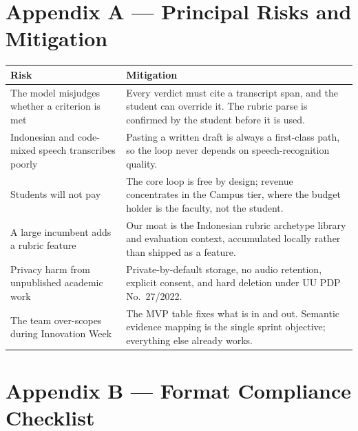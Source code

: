\newpage
\section*{Appendix A --- Principal Risks and Mitigation}

{\fontsize{11}{14}\selectfont
\begin{tabularx}{\textwidth}{@{}L{4.6cm} X@{}}
\toprule
\textbf{Risk} & \textbf{Mitigation} \\
\midrule
The model misjudges whether a criterion is met &
Every verdict must cite a transcript span, and the student can override it. The
rubric parse is confirmed by the student before it is used. \\
\addlinespace
Indonesian and code-mixed speech transcribes poorly &
Pasting a written draft is always a first-class path, so the loop never depends
on speech-recognition quality. \\
\addlinespace
Students will not pay &
The core loop is free by design; revenue concentrates in the Campus tier, where
the budget holder is the faculty, not the student. \\
\addlinespace
A large incumbent adds a rubric feature &
Our moat is the Indonesian rubric archetype library and evaluation context,
accumulated locally rather than shipped as a feature. \\
\addlinespace
Privacy harm from unpublished academic work &
Private-by-default storage, no audio retention, explicit consent, and hard
deletion under UU PDP No.\ 27/2022. \\
\addlinespace
The team over-scopes during Innovation Week &
The MVP table fixes what is in and out. Semantic evidence mapping is the single
sprint objective; everything else already works. \\
\bottomrule
\end{tabularx}}

\newpage
\section*{Appendix B --- Format Compliance Checklist}

